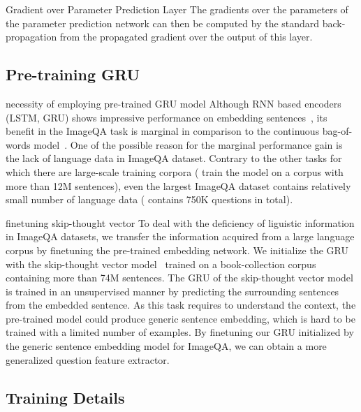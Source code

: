 \documentclass[10pt,twocolumn,letterpaper]{article}
\begin{document}
{\color{blue} Gradient over Parameter Prediction Layer}
{\color{cyan}The gradients} over {\color{cyan}the parameters of the} parameter prediction {\color{cyan}network} can {\color{cyan}then} be computed by {\color{cyan}the standard back-propagation from the propagated gradient over the output of this layer}. 

\subsection{Pre-training GRU}
{\color{blue} necessity of employing pre-trained GRU model}
Although RNN based encoders (\eg LSTM\cite{LSTM}, GRU\cite{chung2014empirical}) shows impressive performance  on {\color{cyan}embedding sentences}~\cite{mikolov2010recurrent, sutskever2014sequence}, its benefit in the ImageQA task is marginal in comparison to the {\color{cyan}continuous bag-of-words model}~\cite{mren2015}.
One of the possible reason for the marginal performance gain is the lack of language data in ImageQA dataset.
Contrary to the other tasks {\color{cyan}for which there are large-scale training corpora} (\eg \cite{sutskever2014sequence} train the model on a corpus with more than 12M sentences), even the largest ImageQA dataset contains relatively small number of language data (\eg \cite{VQA} contains 750K questions in total).

{\color{blue} finetuning skip-thought vector}
To deal with the deficiency {\color{cyan}of liguistic information in ImageQA datasets}, we transfer the information acquired from a large language corpus {\color{cyan}by finetuning the pre-trained embedding network}.
{\color{cyan}We initialize the GRU with the skip-thought vector model~\cite{Skipthought} trained on a book-collection corpus containing more than 74M sentences}.
The {\color{cyan}GRU of the skip-thought vector model} is trained in an unsupervised manner {\color{cyan}by predicting the surrounding sentences from the embedded sentence}.
As this task requires to understand the context, the {\color{cyan}pre-trained model} could produce generic sentence {\color{cyan}embedding}, which is hard to be trained with a limited number of examples.
By finetuning {\color{cyan}our GRU initialized by the generic sentence embedding model} for {\color{cyan}ImageQA}, we can {\color{cyan}obtain a more} generalized question feature extractor.
\fi


\subsection{Training Details}
\end{document}

